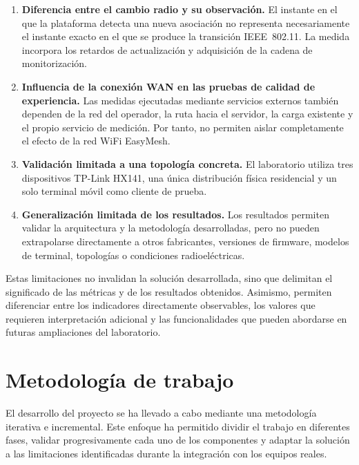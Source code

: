 \begin{enumerate}[
    label=\alph*),
    leftmargin=1.2cm,
    itemsep=0.5em,
    topsep=0.5em
]
    \item \textbf{Diferencia entre el cambio radio y su observación.} El
    instante en el que la plataforma detecta una nueva asociación no
    representa necesariamente el instante exacto en el que se produce la
    transición IEEE~802.11. La medida incorpora los retardos de
    actualización y adquisición de la cadena de monitorización.

    \item \textbf{Influencia de la conexión WAN en las pruebas de
    calidad de experiencia.} Las medidas ejecutadas mediante servicios
    externos también dependen de la red del operador, la ruta hacia el
    servidor, la carga existente y el propio servicio de medición. Por
    tanto, no permiten aislar completamente el efecto de la red WiFi
    EasyMesh.

    \item \textbf{Validación limitada a una topología concreta.} El
    laboratorio utiliza tres dispositivos TP-Link HX141, una única
    distribución física residencial y un solo terminal móvil como
    cliente de prueba.

    \item \textbf{Generalización limitada de los resultados.} Los
    resultados permiten validar la arquitectura y la metodología
    desarrolladas, pero no pueden extrapolarse directamente a otros
    fabricantes, versiones de firmware, modelos de terminal, topologías
    o condiciones radioeléctricas.

\end{enumerate}

Estas limitaciones no invalidan la solución desarrollada, sino que
delimitan el significado de las métricas y de los resultados obtenidos.
Asimismo, permiten diferenciar entre los indicadores directamente
observables, los valores que requieren interpretación adicional y las
funcionalidades que pueden abordarse en futuras ampliaciones del
laboratorio.

\section{Metodología de trabajo}
\label{sec:metodologia-trabajo}

El desarrollo del proyecto se ha llevado a cabo mediante una metodología
iterativa e incremental. Este enfoque ha permitido dividir el trabajo en
diferentes fases, validar progresivamente cada uno de los componentes y
adaptar la solución a las limitaciones identificadas durante la
integración con los equipos reales.

